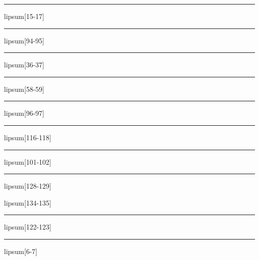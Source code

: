 \documentclass[11pt,a4paper]{article}
\begin{document}
\begin{simplewrap}
  \textcolor{yellow!60}{\rule{5.1cm}{7.0cm}}
\end{simplewrap}
lipsum[15-17]

\begin{simplewrap}
  \textcolor{lime!13}{\rule{3.3cm}{4.9cm}}
\end{simplewrap}
lipsum[94-95]

\begin{simplewrap}
  \textcolor{magenta!55}{\rule{3.2cm}{7.7cm}}
\end{simplewrap}
lipsum[36-37]

\begin{simplewrap}
  \textcolor{magenta!44}{\rule{3.3cm}{5.8cm}}
\end{simplewrap}
lipsum[58-59]

\begin{simplewrap}
  \textcolor{teal!42}{\rule{5.0cm}{4.2cm}}
\end{simplewrap}
lipsum[96-97]

\begin{simplewrap}
  \textcolor{red!42}{\rule{4.6cm}{3.0cm}}
\end{simplewrap}
lipsum[116-118]

\begin{simplewrap}
  \textcolor{green!22}{\rule{5.7cm}{5.7cm}}
\end{simplewrap}
lipsum[101-102]

\begin{simplewrap}
  \textcolor{violet!14}{\rule{3.3cm}{4.2cm}}
\end{simplewrap}
lipsum[128-129]

lipsum[134-135]

\begin{simplewrap}
  \textcolor{red!28}{\rule{4.2cm}{7.5cm}}
\end{simplewrap}
lipsum[122-123]

\begin{simplewrap}
  \textcolor{blue!57}{\rule{4.9cm}{4.3cm}}
\end{simplewrap}
lipsum[6-7]
\end{document}
